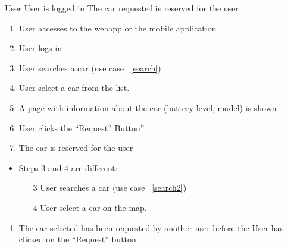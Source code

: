 {User}
{}
{User is logged in}
{The car requested is reserved for the user}
{
\begin{enumerate}
	\item User accesses to the webapp or the mobile application
	\item User logs in
	\item User searches a car (use case ~\ref{search})
	\item User select a car from the list. 
	\item A page with information about the car (battery level, model) is shown
	\item User clicks the ``Request'' Button''
	\item The car is reserved for the user
\end{enumerate}
}
{
\begin{itemize}
\item Steps 3 and 4 are different:
	\begin{enumerate}
	\item[3] User searches a car (use case ~\ref{search2})
	\item[4] User select a car on the map.   
	\end{enumerate}

\end{itemize}


}
{
\begin{enumerate}
\item The car selected has been requested by another user before the User has clicked on the ``Request'' button.
\end{enumerate}

}


\FloatBarrier


